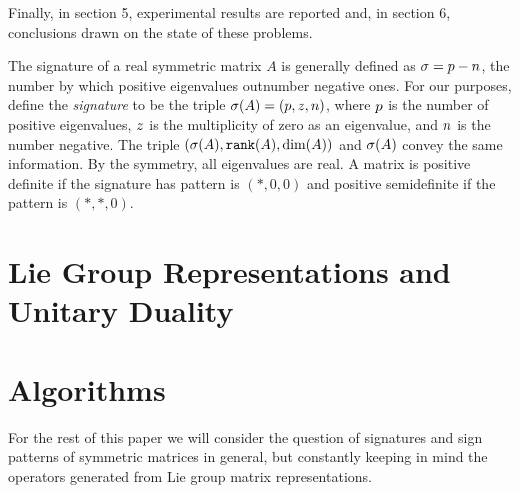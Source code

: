 \documentclass{acm_proc_article-sp}
\begin{document}
Finally, in section 5, experimental results are reported
and, in section 6, conclusions drawn on the state of these problems.

The signature of a real symmetric matrix $A$ is 
generally defined as $\sigma = p - n$, the number by which positive eigenvalues 
outnumber negative ones.  
For our purposes, define the {\em signature} to be the 
triple $\sigma(A) = (p, z, n)$, where $p$ is the number of positive eigenvalues, $z$ is the 
multiplicity of zero as an eigenvalue, and $n$ is the number negative.
The triple $(\sigma(A), \mbox{\tt rank}(A), \dim(A))$ and $\sigma(A)$
convey the same information.  By the symmetry, all eigenvalues are real.
A matrix is 
positive definite if the signature has pattern is $(*, 0, 0)$ and 
positive semidefinite if the pattern is $(*, *, 0)$.

\section{Lie Group Representations and Unitary Duality}


\section{Algorithms} %

For the rest of this paper we will consider the question of signatures and
sign patterns
of symmetric matrices in general, but constantly keeping in mind the 
operators generated from Lie group matrix representations.

%

\end{document}
